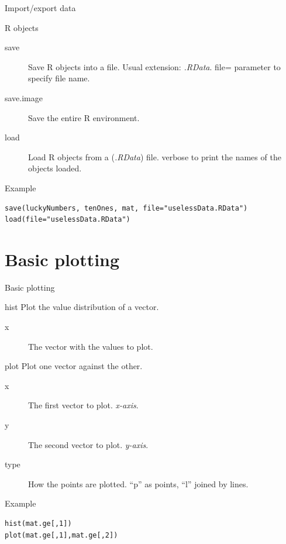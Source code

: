 \documentclass[10pt]{beamer}
\begin{document}
\begin{frame}[fragile]{Import/export data}
  \begin{block}{R objects}
    \begin{description}
      \item[save] Save R objects into a file. Usual extension: {\it .RData}. {\sf file=} parameter to specify file name.
      \item[save.image] Save the entire R environment.
      \item[load] Load R objects from a ({\it .RData}) file. {\sf verbose} to print the names of the objects loaded.
    \end{description}
  \end{block}
  \begin{exampleblock}{Example}
\begin{verbatim}
save(luckyNumbers, tenOnes, mat, file="uselessData.RData")
load(file="uselessData.RData")
\end{verbatim}  
  \end{exampleblock}
\end{frame}









\section{Basic plotting}

\begin{frame}[fragile]{Basic plotting}
  \begin{block}{{\sf hist}}
    Plot the value distribution of a {\sf vector}.
    \begin{description}
    \item[x] The {\sf vector} with the values to plot.
    \end{description}
  \end{block}
  \begin{block}{{\sf plot}}
    Plot one {\sf vector} against the other.
    \begin{description}
      \item[x] The first {\sf vector} to plot. {\it x-axis}. 
      \item[y] The second {\sf vector} to plot. {\it y-axis}. 
      \item[type] How the points are plotted. ``p'' as points, ``l'' joined by lines.
    \end{description}
  \end{block}
  \begin{exampleblock}{Example}
\begin{verbatim}
hist(mat.ge[,1])
plot(mat.ge[,1],mat.ge[,2])
\end{verbatim}  
  \end{exampleblock}
\end{frame}
\end{document}
